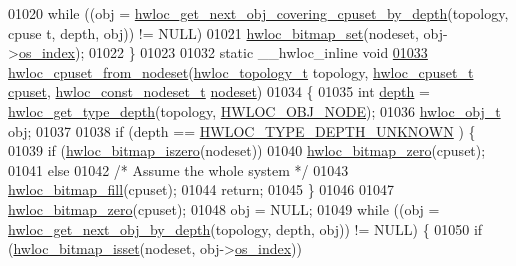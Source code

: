 \begin{DoxyCode}
{{01020         \textcolor{keywordflow}{while} ((obj = \hyperlink{a00056_ga2f9a4ec15e9cfae8c21501257a51ce5b}{hwloc_get_next_obj_covering_cpuset_by_depth}(topology, cpuse
      t, depth, obj)) != NULL)
01021                 \hyperlink{a00065_ga497556af0cc34f109ae0277999c074d3}{hwloc_bitmap_set}(nodeset, obj->\hyperlink{a00016_a61a7a80a68eaccbaaa28269e678c81a9}{os_index});
01022 \}
01023 
01032 \textcolor{keyword}{static} \_\_hwloc\_inline \textcolor{keywordtype}{void}
\hypertarget{a00031_source_l01033}{}\hyperlink{a00062_gaa677fd588304b5615de4ea78104adfb5}{01033} \hyperlink{a00062_gaa677fd588304b5615de4ea78104adfb5}{hwloc_cpuset_from_nodeset}(\hyperlink{a00039_ga9d1e76ee15a7dee158b786c30b6a6e38}{hwloc_topology_t} topology, \hyperlink{a00040_ga4bbf39b68b6f568fb92739e7c0ea7801}{hwloc_cpuset_t} \hyperlink{a00016_a67925e0f2c47f50408fbdb9bddd0790f}{cpuset}, 
      \hyperlink{a00040_ga2f5276235841ad66a79bedad16a5a10c}{hwloc_const_nodeset_t} \hyperlink{a00016_a08f0d0e16c619a6e653526cbee4ffea3}{nodeset})
01034 \{
01035         \textcolor{keywordtype}{int} \hyperlink{a00016_a9d82690370275d42d652eccdea5d3ee5}{depth} = \hyperlink{a00046_gaea7c64dd59467f5201ba87712710b14d}{hwloc_get_type_depth}(topology, \hyperlink{a00041_ggacd37bb612667dc437d66bfb175a8dc55aaf0964881117bdedf1a5e9332cd120dd}{HWLOC_OBJ_NODE});
01036         \hyperlink{a00016}{hwloc_obj_t} obj;
01037 
01038         \textcolor{keywordflow}{if} (depth == \hyperlink{a00046_ggaf4e663cf42bbe20756b849c6293ef575a0565ab92ab72cb0cec91e23003294aad}{HWLOC_TYPE_DEPTH_UNKNOWN} ) \{
01039                 \textcolor{keywordflow}{if} (\hyperlink{a00065_gaa94fed35d2a598bc4a8657b6955b7bf5}{hwloc_bitmap_iszero}(nodeset))
01040                         \hyperlink{a00065_ga6c540b9fe63b8223b6aba46d56dd63b8}{hwloc_bitmap_zero}(cpuset);
01041                 \textcolor{keywordflow}{else}
01042                         \textcolor{comment}{/* Assume the whole system */}
01043                         \hyperlink{a00065_ga52456f7ef79d68e610cb65e3f7ffafad}{hwloc_bitmap_fill}(cpuset);
01044                 \textcolor{keywordflow}{return};
01045         \}
01046 
01047         \hyperlink{a00065_ga6c540b9fe63b8223b6aba46d56dd63b8}{hwloc_bitmap_zero}(cpuset);
01048         obj = NULL;
01049         \textcolor{keywordflow}{while} ((obj = \hyperlink{a00053_gab7c1dce3f42ece5bfa621e87cf332418}{hwloc_get_next_obj_by_depth}(topology, depth, obj)) != NULL)
       \{
01050                 \textcolor{keywordflow}{if} (\hyperlink{a00065_ga2583f44cbdb5fff2ea40efdcf3975d3f}{hwloc_bitmap_isset}(nodeset, obj->\hyperlink{a00016_a61a7a80a68eaccbaaa28269e678c81a9}{os_index}))
}}
\end{DoxyCode}
